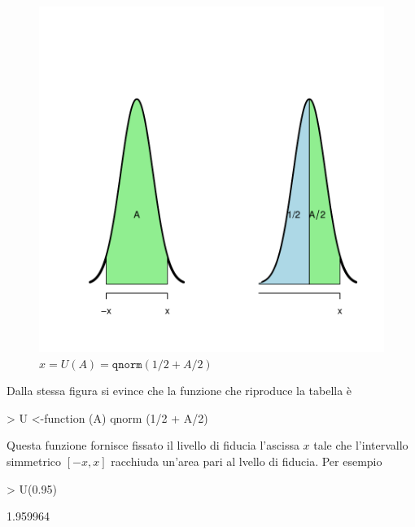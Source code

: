 \documentclass[onecolumn,12pt]{book}
\begin{document}
\begin{figure}[H]
\includegraphics{RbookParte2-073}
\caption{$x=U(A)=\texttt{qnorm}(1/2+A/2)$}
\label{fig:fig12code}
\end{figure}
Dalla stessa figura  si evince che la funzione che riproduce la tabella è
\begin{Schunk}
\begin{Sinput}
> U <-function (A) qnorm (1/2 + A/2)
\end{Sinput}
\end{Schunk}
Questa funzione fornisce fissato il livello di fiducia l'ascissa $x$  tale che l'intervallo simmetrico $[-x,x]$ racchiuda un'area pari al lvello di fiducia. Per esempio
\begin{Schunk}
\begin{Sinput}
> U(0.95)
\end{Sinput}
\begin{Soutput}
[1] 1.959964
\end{Soutput}
\end{Schunk}
\end{document}
